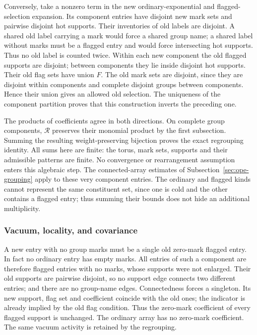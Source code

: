 Conversely, take a nonzero term in the new ordinary-exponential and
flagged-selection expansion. Its component entries have disjoint
new mark sets and pairwise disjoint hot supports. Their inventories
of old labels are disjoint. A shared old label carrying a mark would
force a shared group name; a shared label without marks must be a
flagged entry and would force intersecting hot supports. Thus no old
label is counted twice. Within each new component the old flagged
supports are disjoint; between components they lie inside disjoint
hot supports. Their old flag sets have union $F$. The old mark sets
are disjoint, since they are disjoint within components and complete
disjoint groups between components. Hence their union gives an
allowed old selection. The uniqueness of the component partition
proves that this construction inverts the preceding one.

The products of coefficients agree in both directions. On complete
group components, $\mathcal R$ preserves their monomial product by
the first subsection. Summing the resulting weight-preserving
bijection proves the exact regrouping identity. All sums here are
finite: the torus, mark sets, supports and their admissible patterns
are finite. No convergence or rearrangement assumption enters this
algebraic step. The connected-array estimates of
Subsection~\ref{sec:ope-grouping} apply to these very component entries.
The ordinary and flagged kinds cannot represent the same constituent
set, since one is cold and the other contains a flagged entry; thus
summing their bounds does not hide an additional multiplicity.

\subsubsection{Vacuum, locality, and covariance}
A new entry with no group marks must be a single old zero-mark flagged
entry. In fact no ordinary entry has empty marks. All entries of such
a component are therefore flagged entries with no marks, whose
supports were not enlarged. Their old supports are pairwise disjoint,
so no support edge connects two different entries; and there are no
group-name edges. Connectedness forces a singleton. Its new support,
flag set and coefficient coincide with the old ones; the indicator
is already implied by the old flag condition. Thus the zero-mark
coefficient of every flagged support is unchanged. The ordinary
array has no zero-mark coefficient. The same vacuum activity is
retained by the regrouping.

